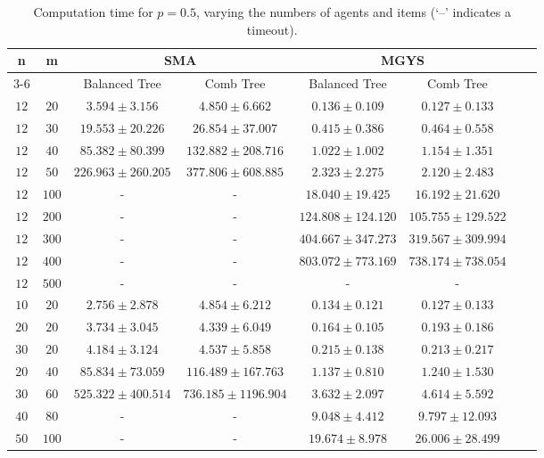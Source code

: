 \documentclass[]{article}
\begin{document}
\begin{table}[h!]
    \small
    \centering
    \caption{Computation time for $p = 0.5$, varying the numbers of agents and items (‘–’ indicates a timeout).}
    \begin{tabular}{|c|c|c|c|c|c|c|c|}
      \hline
      \multirow{3}{*}{n} & \multirow{3}{*}{m} & \multicolumn{2}{c|}{\textbf{SMA}} & \multicolumn{2}{c|}{\textbf{MGYS}} \\
      \cline{3-6}
      & & Balanced Tree & Comb Tree & Balanced Tree & Comb Tree \\
      \hline
      $12$ & $20$  & $3.594 \pm 3.156$ & $4.850 \pm 6.662$ & $0.136 \pm 0.109$ & $0.127 \pm 0.133$ \\
      $12$ & $30$  & $19.553 \pm 20.226$ & $26.854 \pm 37.007$ & $0.415 \pm 0.386$ & $0.464 \pm 0.558$ \\
      $12$ & $40$  & $85.382 \pm 80.399$ & $132.882 \pm 208.716$ & $1.022 \pm 1.002$ & $1.154 \pm 1.351$ \\
      $12$ & $50$  & $226.963 \pm 260.205$ & $377.806 \pm 608.885$ & $2.323 \pm 2.275$ & $2.120 \pm 2.483$ \\
      $12$ & $100$  & - & - & $18.040 \pm 19.425$ & $16.192 \pm 21.620$ \\
      $12$ & $200$  & - & - & $124.808 \pm 124.120$ & $105.755 \pm 129.522$ \\
      $12$ & $300$  & - & - & $404.667 \pm 347.273$ & $319.567 \pm 309.994$ \\
      $12$ & $400$  & - & - & $803.072 \pm 773.169$ & $738.174 \pm 738.054$ \\
      $12$ & $500$  & - & - & - & - \\
      \hline
      $10$ & $20$  & $2.756 \pm 2.878$ & $4.854 \pm 6.212$ & $0.134 \pm 0.121$ & $0.127 \pm 0.133$ \\
      $20$ & $20$  & $3.734 \pm 3.045$ & $4.339 \pm 6.049$ & $0.164 \pm 0.105$ & $0.193 \pm 0.186$ \\
      $30$ & $20$  & $4.184 \pm 3.124$ & $4.537 \pm 5.858$ & $0.215 \pm 0.138$ & $0.213 \pm 0.217$ \\
      \hline
      $20$ & $40$  & $85.834 \pm 73.059$ & $116.489 \pm 167.763$ & $1.137 \pm 0.810$ & $1.240 \pm 1.530$ \\
      $30$ & $60$  & $525.322 \pm 400.514$ & $736.185 \pm 1196.904$ & $3.632 \pm 2.097$ & $4.614 \pm 5.592$ \\
      $40$ & $80$  & - & - & $9.048 \pm 4.412$ & $9.797 \pm 12.093$ \\
      $50$ & $100$  & - & - & $19.674 \pm 8.978$ & $26.006 \pm 28.499$ \\

\end{tabular}
\end{table}
\end{document}
